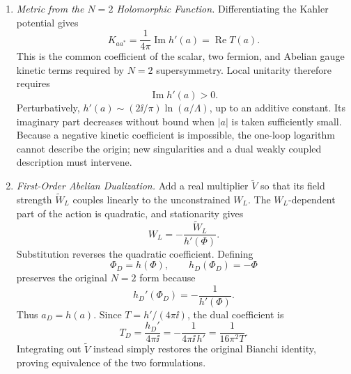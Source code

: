 \begin{enumerate}
  \begin{enumerate}
    \item \emph{Metric from the \(N=2\) Holomorphic Function.}
    Differentiating the Kahler potential gives
      \[
        K_{aa^*}
          =\frac{1}{4\pi}\operatorname{Im}h'(a)
          =\operatorname{Re}T(a).
      \]
      This is the common coefficient of the scalar, two fermion, and Abelian
      gauge kinetic terms required by \(N=2\) supersymmetry.  Local unitarity
      therefore requires
      \[
        \operatorname{Im}h'(a)>0.
      \]
      Perturbatively,
      \(h'(a)\sim(2\ii/\pi)\ln(a/\Lambda)\), up to an additive constant.
      Its imaginary part decreases without bound when \(\lvert a\rvert\) is
      taken sufficiently small.  Because a negative kinetic coefficient is
      impossible, the one-loop logarithm cannot describe the origin; new
      singularities and a dual weakly coupled description must intervene.
    \item \emph{First-Order Abelian Dualization.}
    Add a real multiplier \(\widetilde V\) so that its field strength
      \(\widetilde W_L\) couples linearly to the unconstrained \(W_L\).
      The \(W_L\)-dependent part of the action is quadratic, and stationarity
      gives
      \[
        W_L=-\frac{\widetilde W_L}{h'(\Phi)}.
      \]
      Substitution reverses the quadratic coefficient.  Defining
      \[
        \Phi_D=h(\Phi),\qquad h_D(\Phi_D)=-\Phi
      \]
      preserves the original \(N=2\) form because
      \[
        h_D'(\Phi_D)=-\frac{1}{h'(\Phi)}.
      \]
      Thus \(a_D=h(a)\).  Since
      \(T=h'/(4\pi \ii)\), the dual coefficient is
      \[
        T_D=\frac{h_D'}{4\pi \ii}
          =-\frac{1}{4\pi \ii\,h'}
          =\frac{1}{16\pi^2T}.
      \]
      Integrating out \(\widetilde V\) instead simply restores the original
      Bianchi identity, proving equivalence of the two formulations.
  \end{enumerate}


\end{enumerate}
